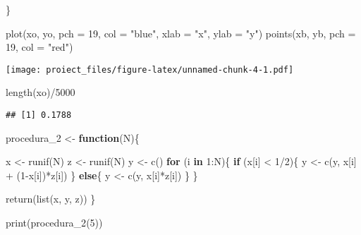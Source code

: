 \documentclass[
]{article}
\newenvironment{Shaded}{\begin{snugshade}}{\end{snugshade}}
\newcommand{\AttributeTok}[1]{\textcolor[rgb]{0.77,0.63,0.00}{#1}}
\newcommand{\ControlFlowTok}[1]{\textcolor[rgb]{0.13,0.29,0.53}{\textbf{#1}}}
\newcommand{\DecValTok}[1]{\textcolor[rgb]{0.00,0.00,0.81}{#1}}
\newcommand{\FunctionTok}[1]{\textcolor[rgb]{0.00,0.00,0.00}{#1}}
\newcommand{\NormalTok}[1]{#1}
\newcommand{\OtherTok}[1]{\textcolor[rgb]{0.56,0.35,0.01}{#1}}
\newcommand{\SpecialCharTok}[1]{\textcolor[rgb]{0.00,0.00,0.00}{#1}}
\newcommand{\StringTok}[1]{\textcolor[rgb]{0.31,0.60,0.02}{#1}}
\begin{document}
\begin{Shaded}
\begin{Highlighting}[]
\NormalTok{\}}

\FunctionTok{plot}\NormalTok{(xo, yo, }\AttributeTok{pch =} \DecValTok{19}\NormalTok{, }\AttributeTok{col =} \StringTok{"blue"}\NormalTok{, }\AttributeTok{xlab =} \StringTok{"x"}\NormalTok{, }\AttributeTok{ylab =} \StringTok{"y"}\NormalTok{)}
\FunctionTok{points}\NormalTok{(xb, yb, }\AttributeTok{pch =} \DecValTok{19}\NormalTok{, }\AttributeTok{col =} \StringTok{"red"}\NormalTok{)}
\end{Highlighting}
\end{Shaded}

\texttt{[image: proiect\_files/figure-latex/unnamed-chunk-4-1.pdf]}

\begin{Shaded}
\begin{Highlighting}[]
\FunctionTok{length}\NormalTok{(xo)}\SpecialCharTok{/}\DecValTok{5000}
\end{Highlighting}
\end{Shaded}

\begin{verbatim}
## [1] 0.1788
\end{verbatim}

\begin{Shaded}
\begin{Highlighting}[]
\NormalTok{procedura\_2 }\OtherTok{\textless{}{-}} \ControlFlowTok{function}\NormalTok{(N)\{}
  
\NormalTok{x }\OtherTok{\textless{}{-}} \FunctionTok{runif}\NormalTok{(N)}
\NormalTok{z }\OtherTok{\textless{}{-}} \FunctionTok{runif}\NormalTok{(N)}
\NormalTok{y }\OtherTok{\textless{}{-}} \FunctionTok{c}\NormalTok{()}
\ControlFlowTok{for}\NormalTok{ (i }\ControlFlowTok{in} \DecValTok{1}\SpecialCharTok{:}\NormalTok{N)\{}
  \ControlFlowTok{if}\NormalTok{ (x[i] }\SpecialCharTok{\textless{}} \DecValTok{1}\SpecialCharTok{/}\DecValTok{2}\NormalTok{)\{}
\NormalTok{    y }\OtherTok{\textless{}{-}} \FunctionTok{c}\NormalTok{(y, x[i] }\SpecialCharTok{+}\NormalTok{ (}\DecValTok{1}\SpecialCharTok{{-}}\NormalTok{x[i])}\SpecialCharTok{*}\NormalTok{z[i])}
\NormalTok{  \}}
  \ControlFlowTok{else}\NormalTok{\{}
\NormalTok{    y }\OtherTok{\textless{}{-}} \FunctionTok{c}\NormalTok{(y, x[i]}\SpecialCharTok{*}\NormalTok{z[i])}
\NormalTok{  \}}
\NormalTok{\}}

\FunctionTok{return}\NormalTok{(}\FunctionTok{list}\NormalTok{(x, y, z))}
\NormalTok{\}}

\FunctionTok{print}\NormalTok{(}\FunctionTok{procedura\_2}\NormalTok{(}\DecValTok{5}\NormalTok{))}
\end{Highlighting}
\end{Shaded}
\end{document}
